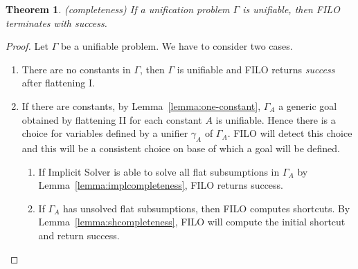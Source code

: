 \documentclass{article}
\newtheorem{theorem}{Theorem}
\begin{document}
	\begin{theorem}(completeness)
		If a unification problem $\Gamma$ is unifiable,
		then FILO terminates with \emph{success}.
	\end{theorem}
	
		
	\begin{proof}
		Let $\Gamma$ be a unifiable problem.   We have to consider two cases.
		\begin{enumerate}
			\item There are no constants in $\Gamma$, then $\Gamma$ is unifiable and  FILO returns \emph{success} after flattening I.
			\item If there are constants, by Lemma~\ref{lemma:one-constant}, $\Gamma_A$ a generic goal obtained by flattening II for
			each constant $A$ is unifiable. Hence there is a choice for variables defined by a unifier $\gamma_A$ of $\Gamma_A$.
			FILO will detect this choice and this will be a consistent choice on base of which a goal will be defined.
			\begin{enumerate}
				\item If Implicit Solver is able to solve all flat subsumptions in $\Gamma_A$ by Lemma~\ref{lemma:implcompleteness}, FILO returns success.
				\item If $\Gamma_A$ has unsolved flat subsumptions, then FILO computes shortcuts. By Lemma~\ref{lemma:shcompleteness}, FILO will compute
			the initial shortcut and return success.
			\end{enumerate}
		\end{enumerate}
%			
	\end{proof}
	
\end{document}

